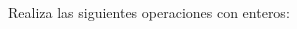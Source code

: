 \documentclass[addpoints,spanish, 12pt,a4paper]{exam}
\begin{document}
\begin{questions}

\question[2] Realiza las siguientes operaciones con enteros:
\begin{multicols}{2}
\end{multicols}


    
    
    
    



\end{questions}
\end{document}
